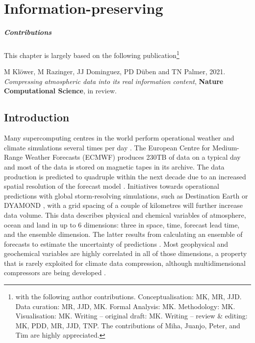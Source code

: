 \chapter{Information-preserving }
\label{chap:compression}

{\small
\paragraph{Contributions} This chapter is largely based on the following publication\footnote{with the following author contributions.
Conceptualisation: MK, MR, JJD. Data curation: MR, JJD, MK. Formal Analysis: MK. Methodology: MK. Visualisation: MK. Writing –
original draft: MK. Writing – review \& editing: MK, PDD, MR, JJD, TNP. The contributions of Miha, Juanjo, Peter, and Tim are highly
appreciated.}

\vspace{\baselineskip}
\indent M Klöwer, M Razinger, JJ Dominguez, PD Düben and TN Palmer, 2021. \emph{Compressing atmospheric data into its real
information content}, \textbf{Nature Computational Science}, in review.
\vspace{\baselineskip}}

\section{Introduction}
\label{sec:compression_introduction}

Many supercomputing centres in the world perform operational weather and climate simulations several times per day \citep{Bauer2015}.
The European Centre for Medium-Range Weather Forecasts (ECMWF) produces 230TB of data on a typical day and
most of the data is stored on magnetic tapes in its archive. The data production is predicted to quadruple within the
next decade due to an increased spatial resolution of the forecast model \citep{Bauer2020,Voosen2020,Schar2020}.
Initiatives towards operational predictions with global storm-resolving simulations, such as Destination Earth
\citep{Bauer2021,Bauer2021a} or DYAMOND \citep{Stevens2019}, with a grid spacing of a couple of
kilometres will further increase data volume. This data describes physical and chemical variables of atmosphere, ocean
and land in up to 6 dimensions: three in space, time, forecast lead time, and the ensemble dimension. The latter results
from calculating an ensemble of forecasts to estimate the uncertainty of predictions \citep{Molteni1996,Palmer2019}.
Most geophysical and geochemical variables are highly correlated in all of those dimensions, a property that is rarely
exploited for climate data compression, although multidimensional compressors are being developed
\citep{Ballester-Ripoll2020,Lindstrom2014,vonLarcher2019,Zhao2020,Di2016}.

